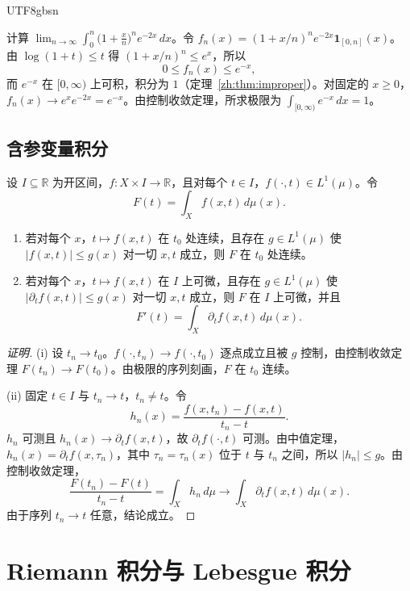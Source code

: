 \documentclass[11pt]{article}
\makeatletter
\newcommand{\envlabel}[1]{\protected@edef\@currentlabel{\themathenv}\label{#1}}
\makeatother
\begin{document}
\begin{CJK*}{UTF8}{gbsn}
\begin{example}
计算 $\displaystyle\lim_{n\to\infty}\int_{0}^{n}\Big(1+\frac{x}{n}\Big)^{n}e^{-2x}\,dx$。令 $f_{n}(x)=(1+x/n)^{n}e^{-2x}\mathbf{1}_{[0,n]}(x)$。由 $\log(1+t)\leq t$ 得 $(1+x/n)^{n}\leq e^{x}$，所以
\[
0\leq f_{n}(x)\leq e^{-x},
\]
而 $e^{-x}$ 在 $[0,\infty)$ 上可积，积分为 $1$（定理~\ref{zh:thm:improper}）。对固定的 $x\geq0$，$f_{n}(x)\to e^{x}e^{-2x}=e^{-x}$。由控制收敛定理，所求极限为 $\int_{[0,\infty)}e^{-x}\,dx=1$。
\end{example}

\subsection{含参变量积分}

\begin{theorem}\envlabel{zh:thm:param}
设 $I\subseteq\mathbb{R}$ 为开区间，$f:X\times I\to\mathbb{R}$，且对每个 $t\in I$，$f(\cdot,t)\in L^{1}(\mu)$。令
\[
F(t)=\int_{X}f(x,t)\,d\mu(x).
\]
\begin{enumerate}
  \item 若对每个 $x$，$t\mapsto f(x,t)$ 在 $t_{0}$ 处连续，且存在 $g\in L^{1}(\mu)$ 使 $|f(x,t)|\leq g(x)$ 对一切 $x,t$ 成立，则 $F$ 在 $t_{0}$ 处连续。
  \item 若对每个 $x$，$t\mapsto f(x,t)$ 在 $I$ 上可微，且存在 $g\in L^{1}(\mu)$ 使 $|\partial_{t}f(x,t)|\leq g(x)$ 对一切 $x,t$ 成立，则 $F$ 在 $I$ 上可微，并且
  \[
  F'(t)=\int_{X}\partial_{t}f(x,t)\,d\mu(x).
  \]
\end{enumerate}
\end{theorem}

\begin{proof}[证明]
(i) 设 $t_{n}\to t_{0}$。$f(\cdot,t_{n})\to f(\cdot,t_{0})$ 逐点成立且被 $g$ 控制，由控制收敛定理 $F(t_{n})\to F(t_{0})$。由极限的序列刻画，$F$ 在 $t_{0}$ 连续。

(ii) 固定 $t\in I$ 与 $t_{n}\to t$，$t_{n}\neq t$。令
\[
h_{n}(x)=\frac{f(x,t_{n})-f(x,t)}{t_{n}-t}.
\]
$h_{n}$ 可测且 $h_{n}(x)\to\partial_{t}f(x,t)$，故 $\partial_{t}f(\cdot,t)$ 可测。由中值定理，$h_{n}(x)=\partial_{t}f(x,\tau_{n})$，其中 $\tau_{n}=\tau_{n}(x)$ 位于 $t$ 与 $t_{n}$ 之间，所以 $|h_{n}|\leq g$。由控制收敛定理，
\[
\frac{F(t_{n})-F(t)}{t_{n}-t}=\int_{X}h_{n}\,d\mu\to\int_{X}\partial_{t}f(x,t)\,d\mu(x).
\]
由于序列 $t_{n}\to t$ 任意，结论成立。
\end{proof}

\section{Riemann 积分与 Lebesgue 积分}


\end{CJK*}
\end{document}
